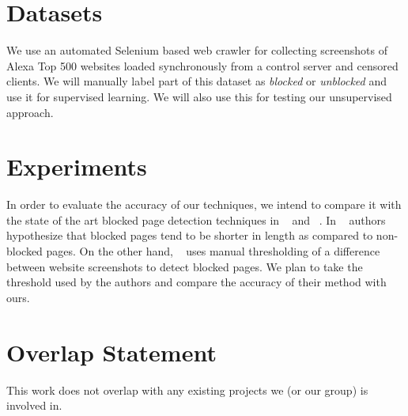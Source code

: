 \documentclass{article} %
\begin{document}
\section{Datasets}
\vspace{-.2cm}
\label{dataset}
We use an automated Selenium based web crawler for collecting screenshots of Alexa Top 500 websites loaded synchronously from
a control server and censored clients. We will manually label part of this dataset as \emph{blocked}
or \emph{unblocked} and use it for supervised learning. We will also use this for testing our unsupervised approach.
\vspace{-.2cm}
\section{Experiments}
\vspace{-.2cm}
In order to evaluate the accuracy of our techniques, we intend to compare it with the state of the art blocked page detection
techniques in ~\parencite{imc14_phillipa} and ~\parencite{torabuse}. In ~\parencite{imc14_phillipa} authors hypothesize that blocked pages tend
to be shorter in length as compared to non-blocked pages. On the other hand, ~\parencite{torabuse} uses manual thresholding of
a difference between website screenshots to detect blocked pages. We plan to take the threshold used by the authors 
and compare the accuracy of their method with ours.
\vspace{-.2cm}
\section{Overlap Statement}
\vspace{-.2cm}
This work does not overlap with any existing projects we (or our group) is involved in.
\vspace{-.2cm}
\end{document}
